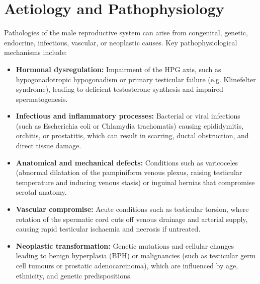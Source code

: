 \section*{Aetiology and Pathophysiology}
Pathologies of the male reproductive system can arise from congenital, genetic, endocrine, infectious, vascular, or neoplastic causes. Key pathophysiological mechanisms include:
\begin{itemize}
    \item \textbf{Hormonal dysregulation:} Impairment of the HPG axis, such as hypogonadotropic hypogonadism or primary testicular failure (e.g. Klinefelter syndrome), leading to deficient testosterone synthesis and impaired spermatogenesis.
    \item \textbf{Infectious and inflammatory processes:} Bacterial or viral infections (such as Escherichia coli or Chlamydia trachomatis) causing epididymitis, orchitis, or prostatitis, which can result in scarring, ductal obstruction, and direct tissue damage.
    \item \textbf{Anatomical and mechanical defects:} Conditions such as varicoceles (abnormal dilatation of the pampiniform venous plexus, raising testicular temperature and inducing venous stasis) or inguinal hernias that compromise scrotal anatomy.
    \item \textbf{Vascular compromise:} Acute conditions such as testicular torsion, where rotation of the spermatic cord cuts off venous drainage and arterial supply, causing rapid testicular ischaemia and necrosis if untreated.
    \item \textbf{Neoplastic transformation:} Genetic mutations and cellular changes leading to benign hyperplasia (BPH) or malignancies (such as testicular germ cell tumours or prostatic adenocarcinoma), which are influenced by age, ethnicity, and genetic predispositions.
\end{itemize}

